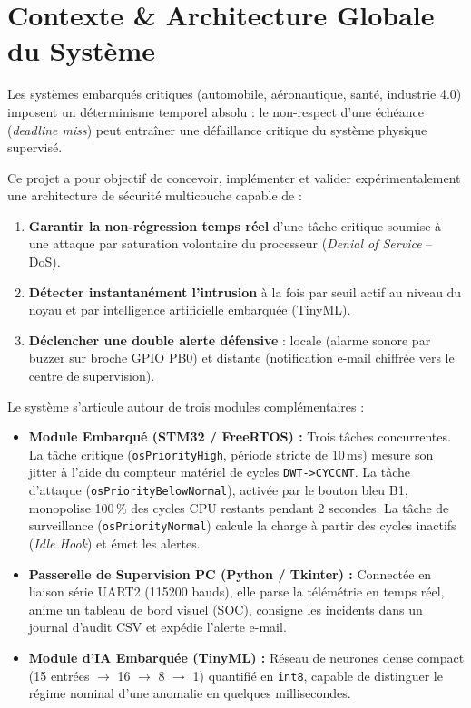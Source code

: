\documentclass[a4paper,11pt]{article}
\begin{document}
\section{Contexte \& Architecture Globale du Système}

Les systèmes embarqués critiques (automobile, aéronautique, santé, industrie 4.0) imposent un déterminisme temporel absolu : le non-respect d'une échéance (\textit{deadline miss}) peut entraîner une défaillance critique du système physique supervisé.

Ce projet a pour objectif de concevoir, implémenter et valider expérimentalement une architecture de sécurité multicouche capable de :
\begin{enumerate}[leftmargin=1.8em]
  \item \textbf{Garantir la non-régression temps réel} d'une tâche critique soumise à une attaque par saturation volontaire du processeur (\textit{Denial of Service} -- DoS).
  \item \textbf{Détecter instantanément l'intrusion} à la fois par seuil actif au niveau du noyau et par intelligence artificielle embarquée (TinyML).
  \item \textbf{Déclencher une double alerte défensive} : locale (alarme sonore par buzzer sur broche GPIO PB0) et distante (notification e-mail chiffrée vers le centre de supervision).
\end{enumerate}

Le système s'articule autour de trois modules complémentaires :
\begin{itemize}[leftmargin=1.8em]
  \item \textbf{Module Embarqué (STM32 / FreeRTOS) :} Trois tâches concurrentes. La tâche critique (\texttt{osPriorityHigh}, période stricte de 10\,ms) mesure son jitter à l'aide du compteur matériel de cycles \texttt{DWT->CYCCNT}. La tâche d'attaque (\texttt{osPriorityBelowNormal}), activée par le bouton bleu B1, monopolise 100\,\% des cycles CPU restants pendant 2 secondes. La tâche de surveillance (\texttt{osPriorityNormal}) calcule la charge à partir des cycles inactifs (\textit{Idle Hook}) et émet les alertes.
  \item \textbf{Passerelle de Supervision PC (Python / Tkinter) :} Connectée en liaison série UART2 (115200 bauds), elle parse la télémétrie en temps réel, anime un tableau de bord visuel (SOC), consigne les incidents dans un journal d'audit CSV et expédie l'alerte e-mail.
  \item \textbf{Module d'IA Embarquée (TinyML) :} Réseau de neurones dense compact (15 entrées $\to$ 16 $\to$ 8 $\to$ 1) quantifié en \texttt{int8}, capable de distinguer le régime nominal d'une anomalie en quelques millisecondes.
\end{itemize}
\end{document}
